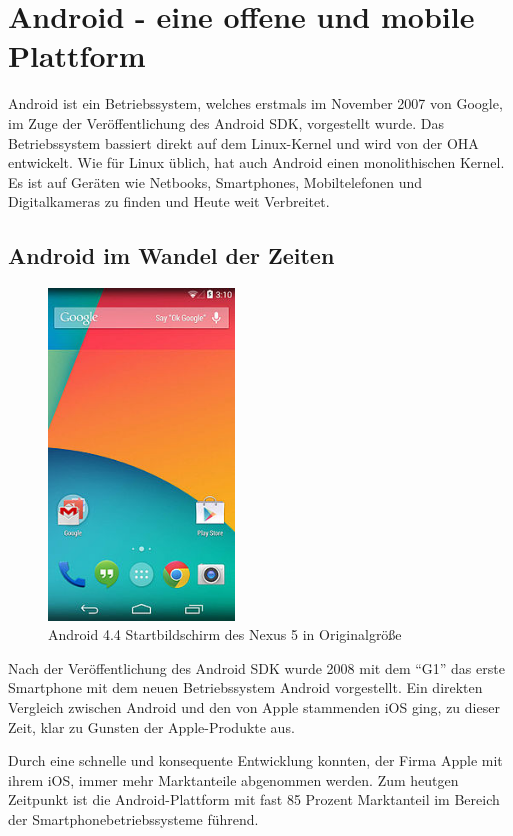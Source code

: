\section{Android - eine offene und mobile Plattform}
Android ist ein Betriebssystem, welches erstmals im November 2007 von Google, im Zuge der Ver\"offentlichung des Android \ac{SDK}, vorgestellt wurde. Das Betriebssystem bassiert direkt auf dem Linux-Kernel und wird von der \ac{OHA} entwickelt. Wie f\"ur Linux \"ublich, hat auch Android einen monolithischen Kernel. Es ist auf Ger\"aten wie Netbooks, Smartphones, Mobiltelefonen und Digitalkameras zu finden und Heute weit Verbreitet. \cite{Kuehn12}

\subsection{Android im Wandel der Zeiten}
\begin{figure}
\vspace{-13pt}
\includegraphics[width=4.95cm]{Bilder/Android4.jpg}
\caption{Android 4.4 Startbildschirm des Nexus 5 in Originalgr\"o\ss{}e \cite{WikiAndroid}}
\label{Der MongoDB-Chooser-Dialog}
\vspace{-20pt}
\end{figure}
Nach der Ver\"offentlichung des Android \ac{SDK} wurde 2008 mit dem "`G1"' das erste Smartphone mit dem neuen Betriebssystem Android vorgestellt. Ein direkten Vergleich zwischen Android und den von Apple stammenden iOS ging, zu dieser Zeit, klar zu Gunsten der Apple-Produkte aus.
 
Durch eine schnelle und konsequente Entwicklung konnten, der Firma Apple mit ihrem iOS, immer mehr Marktanteile abgenommen werden. Zum heutgen Zeitpunkt ist die Android-Plattform mit fast 85 Prozent Marktanteil im Bereich der Smartphonebetriebssysteme f\"uhrend. \cite{GolemMobileBetriebssystem}

